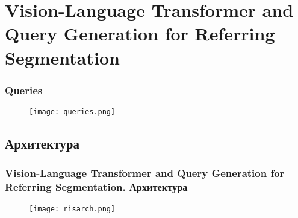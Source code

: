 
\section{Vision-Language Transformer and Query Generation for Referring
Segmentation}
\begin{frame}
    \frametitle{Queries}
    \begin{figure}
        \texttt{[image: queries.png]}
    \end{figure}
\end{frame}
\subsection{Архитектура}
\begin{frame}
    \frametitle{Vision-Language Transformer and Query Generation for Referring
    Segmentation. Архитектура}
    \begin{figure}
        \texttt{[image: risarch.png]}
    \end{figure}
\end{frame}
